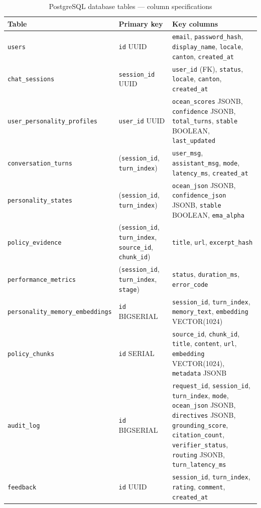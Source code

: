 \documentclass[10pt,a4paper]{report}
\begin{document}
\begin{table}[H]
\centering\small
\caption{PostgreSQL database tables --- column specifications}
\begin{tabularx}{\textwidth}{@{}llX@{}}
\toprule
Table & Primary key & Key columns \\
\midrule
\texttt{users} & \texttt{id} UUID & \texttt{email}, \texttt{password\_hash}, \texttt{display\_name}, \texttt{locale}, \texttt{canton}, \texttt{created\_at} \\
\texttt{chat\_sessions} & \texttt{session\_id} UUID & \texttt{user\_id} (FK), \texttt{status}, \texttt{locale}, \texttt{canton}, \texttt{created\_at} \\
\texttt{user\_personality\_profiles} & \texttt{user\_id} UUID & \texttt{ocean\_scores} JSONB, \texttt{confidence} JSONB, \texttt{total\_turns}, \texttt{stable} BOOLEAN, \texttt{last\_updated} \\
\texttt{conversation\_turns} & (\texttt{session\_id}, \texttt{turn\_index}) & \texttt{user\_msg}, \texttt{assistant\_msg}, \texttt{mode}, \texttt{latency\_ms}, \texttt{created\_at} \\
\texttt{personality\_states} & (\texttt{session\_id}, \texttt{turn\_index}) & \texttt{ocean\_json} JSONB, \texttt{confidence\_json} JSONB, \texttt{stable} BOOLEAN, \texttt{ema\_alpha} \\
\texttt{policy\_evidence} & (\texttt{session\_id}, \texttt{turn\_index}, \texttt{source\_id}, \texttt{chunk\_id}) & \texttt{title}, \texttt{url}, \texttt{excerpt\_hash} \\
\texttt{performance\_metrics} & (\texttt{session\_id}, \texttt{turn\_index}, \texttt{stage}) & \texttt{status}, \texttt{duration\_ms}, \texttt{error\_code} \\
\texttt{personality\_memory\_embeddings} & \texttt{id} BIGSERIAL & \texttt{session\_id}, \texttt{turn\_index}, \texttt{memory\_text}, \texttt{embedding} VECTOR(1024) \\
\texttt{policy\_chunks} & \texttt{id} SERIAL & \texttt{source\_id}, \texttt{chunk\_id}, \texttt{title}, \texttt{content}, \texttt{url}, \texttt{embedding} VECTOR(1024), \texttt{metadata} JSONB \\
\texttt{audit\_log} & \texttt{id} BIGSERIAL & \texttt{request\_id}, \texttt{session\_id}, \texttt{turn\_index}, \texttt{mode}, \texttt{ocean\_json} JSONB, \texttt{directives} JSONB, \texttt{grounding\_score}, \texttt{citation\_count}, \texttt{verifier\_status}, \texttt{routing} JSONB, \texttt{turn\_latency\_ms} \\
\texttt{feedback} & \texttt{id} UUID & \texttt{session\_id}, \texttt{turn\_index}, \texttt{rating}, \texttt{comment}, \texttt{created\_at} \\
\bottomrule
\end{tabularx}
\end{table}
\end{document}
